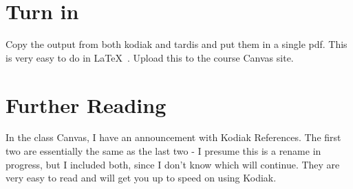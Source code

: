 \documentclass{article}
\begin{document}
	\section{Turn in}
	Copy the output from both kodiak and tardis and put them in a single pdf.  This is very easy to do in \LaTeX\ .  Upload this to the course Canvas site.
	
	
	\section{Further Reading}
	In the class Canvas, I have an announcement with Kodiak References.  The first two are essentially the same as the last two - I presume this is a rename in progress, but I included both, since I don't know which will continue.  They are very easy to read and will get you up to speed on using Kodiak.
	
\end{document}
